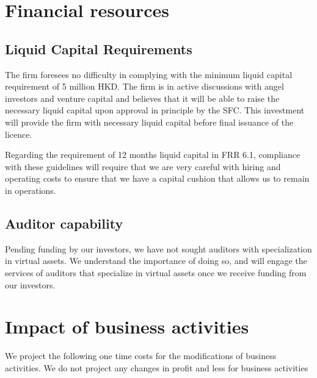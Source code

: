 \section{Financial resources}
\subsection{Liquid Capital Requirements}

The firm foresees no difficulty in complying with the minimum liquid
capital requirement of 5 million HKD.  The firm is in active
discussions with angel investors and venture capital and believes that
it will be able to raise the necessary liquid capital upon approval in
principle by the SFC. This investment will provide the firm with
necessary liquid capital before final issuance of the licence.

Regarding the requirement of 12 months liquid capital in FRR
6.1, compliance with these guidelines will require that we are very
careful with hiring and operating costs to ensure that we
have a capital cushion that allows us to remain in operations.


\subsection{Auditor capability}
Pending funding by our investors, we have not sought auditors with
specialization in virtual assets.  We understand the importance of
doing so, and will engage the services of auditors that specialize in
virtual assets once we receive funding from our investors.

\section{Impact of business activities}

We project the following one time costs for the modifications of
business activities.  We do not project any changes in profit and less
for business activities

